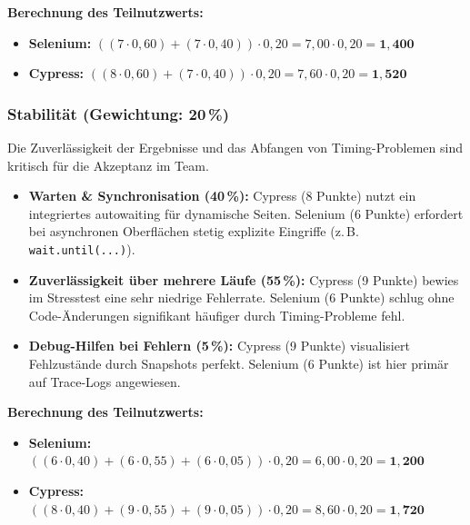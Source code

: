 \textbf{Berechnung des Teilnutzwerts:}
\begin{itemize}
    \item[] \textbf{Selenium:} $((7 \cdot 0{,}60) + (7 \cdot 0{,}40)) \cdot 0{,}20 = 7{,}00 \cdot 0{,}20 = \mathbf{1{,}400}$
    \item[] \textbf{Cypress:} $((8 \cdot 0{,}60) + (7 \cdot 0{,}40)) \cdot 0{,}20 = 7{,}60 \cdot 0{,}20 = \mathbf{1{,}520}$
\end{itemize}


\subsubsection{Stabilität (Gewichtung: 20\,\%)}
\label{sec:eval_stabilitaet}
Die Zuverlässigkeit der Ergebnisse und das Abfangen von Timing-Problemen sind kritisch für die Akzeptanz im Team.
\begin{itemize}
    \item \textbf{Warten \& Synchronisation (40\,\%):} Cypress (8 Punkte) nutzt ein integriertes \gls{autowaiting} für dynamische Seiten. Selenium (6 Punkte) erfordert bei asynchronen Oberflächen stetig explizite Eingriffe (z.\,B. \texttt{wait.until(...)}).
    \item \textbf{Zuverlässigkeit über mehrere Läufe (55\,\%):} Cypress (9 Punkte) bewies im Stresstest eine sehr niedrige Fehlerrate. Selenium (6 Punkte) schlug ohne Code-Änderungen signifikant häufiger durch Timing-Probleme fehl.
    \item \textbf{Debug-Hilfen bei Fehlern (5\,\%):} Cypress (9 Punkte) visualisiert Fehlzustände durch Snapshots perfekt. Selenium (6 Punkte) ist hier primär auf Trace-Logs angewiesen.
\end{itemize}

\textbf{Berechnung des Teilnutzwerts:}
\begin{itemize}
    \item[] \textbf{Selenium:} $((6 \cdot 0{,}40) + (6 \cdot 0{,}55) + (6 \cdot 0{,}05)) \cdot 0{,}20 = 6{,}00 \cdot 0{,}20 = \mathbf{1{,}200}$
    \item[] \textbf{Cypress:} $((8 \cdot 0{,}40) + (9 \cdot 0{,}55) + (9 \cdot 0{,}05)) \cdot 0{,}20 = 8{,}60 \cdot 0{,}20 = \mathbf{1{,}720}$
\end{itemize}


